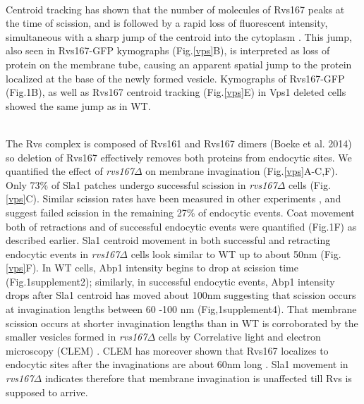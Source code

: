\documentclass[9pt,lineno]{elife}
\begin{document}
~\\
Centroid tracking has shown that the number of molecules of Rvs167 peaks at the time of  scission, and is followed by a rapid loss of fluorescent intensity, simultaneous with a sharp jump of the centroid into the cytoplasm \cite{Picco2015}. This jump, also seen in Rvs167-GFP kymographs (Fig.\ref{vps}B), is interpreted as loss of protein on the membrane tube, causing an apparent spatial jump to the protein localized at the base of the newly formed vesicle. Kymographs of Rvs167-GFP (Fig.1B), as well as Rvs167 centroid tracking (Fig.\ref{vps}E) in Vps1 deleted cells showed the same jump as in WT. 

~\\
The Rvs complex is composed of Rvs161 and Rvs167 dimers (Boeke et al. 2014) so deletion of Rvs167 effectively removes both proteins from endocytic sites. We quantified the effect of \textit{rvs167$\Delta$}  on membrane invagination (Fig.\ref{vps}A-C,F). Only 73\% of Sla1 patches undergo successful scission in \textit{rvs167$\Delta$}  cells (Fig.\ref{vps}C). Similar scission rates have been measured in other experiments \cite{Kaksonen2005}, and suggest failed scission in the remaining 27\% of endocytic events. Coat movement both of retractions and of successful endocytic events were quantified (Fig.1F) as described earlier. Sla1 centroid movement in both successful and retracting endocytic events in \textit{rvs167$\Delta$}  cells look similar to WT up to about 50nm (Fig.\ref{vps}F). In WT cells, Abp1 intensity begins to drop at scission time (Fig.1supplement2); similarly, in successful endocytic events, Abp1 intensity drops after Sla1 centroid has moved about 100nm suggesting that scission occurs at invagination lengths between 60 -100 nm (Fig,1supplement4). That membrane scission occurs at shorter invagination lengths than in WT is corroborated  by the smaller vesicles formed in \textit{rvs167$\Delta$}  cells by Correlative light and electron microscopy (CLEM) \cite{Kukulski2012}. CLEM has moreover shown that Rvs167 localizes to endocytic sites after the invaginations are about 60nm long \cite{Kukulski2012}. Sla1 movement in \textit{rvs167$\Delta$} indicates therefore that membrane invagination is unaffected till Rvs is supposed to arrive. 


\end{document}
